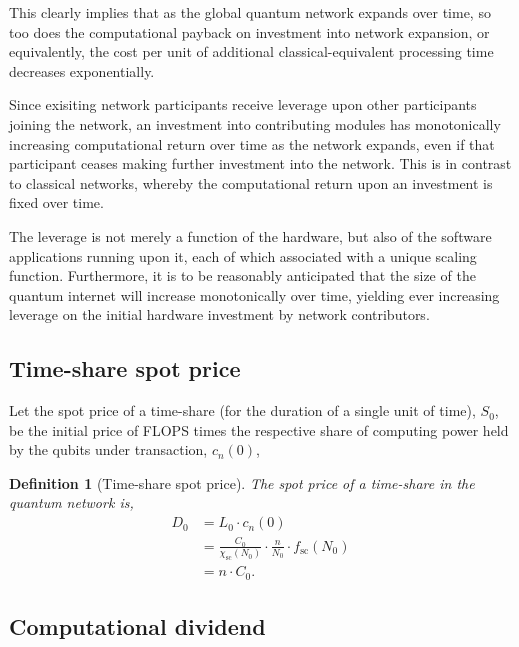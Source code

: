 \documentclass[aps, rmp, twocolumn, amsmath, amssymb, nofootinbib, superscriptaddress, longbibliography, floatfix, table-of-contents, eqsecnum]{revtex4-1}
\newtheorem{definition}{Definition}
\begin{document}
This clearly implies that as the global quantum network expands over time, so too does the computational payback on investment into network expansion, or equivalently, the cost per unit of additional classical-equivalent processing time decreases exponentially.

Since exisiting network participants receive leverage upon other participants joining the network, an investment into contributing modules has monotonically increasing computational return over time as the network expands, even if that participant ceases making further investment into the network. This is in contrast to classical networks, whereby the computational return upon an investment is fixed over time.

The leverage is not merely a function of the hardware, but also of the software applications running upon it, each of which associated with a unique scaling function. Furthermore, it is to be reasonably anticipated that the size of the quantum internet will increase monotonically over time, yielding ever increasing leverage on the initial hardware investment by network contributors.

%
%

\subsection{Time-share spot price}\label{sec:time_share_spot}

Let the spot price of a time-share (for the duration of a single unit of time), $S_0$, be the initial price of FLOPS times the respective share of computing power held by the qubits under transaction, $c_n(0)$,
\begin{definition}[Time-share spot price] 
The spot price of a time-share in the quantum network is,
\begin{align}
D_0 &= L_0 \cdot c_n(0) \nonumber \\
&= \frac{C_0}{\chi_\text{sc}(N_0)} \cdot \frac{n}{N_0} \cdot f_\text{sc}(N_0) \nonumber \\
&= n\cdot C_0.
\end{align}
\end{definition}

%
%

\subsection{Computational dividend}\label{sec:comp_div}
\end{document}
